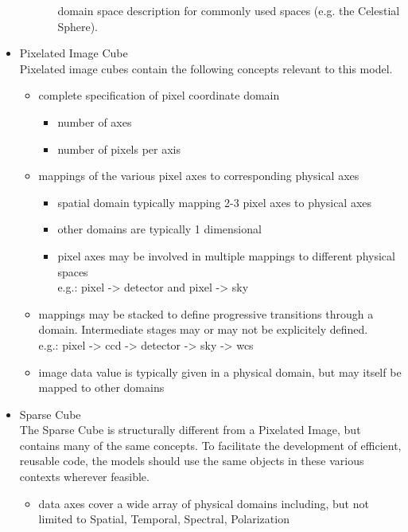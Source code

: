 \documentclass[11pt,a4paper]{ivoa}
\begin{document}
\begin{itemize}
\begin{itemize}
\begin{itemize}
                domain space description for commonly used spaces (e.g. the Celestial Sphere). 
       \end{itemize}
    \end{itemize}
    \item Pixelated Image Cube \\
      Pixelated image cubes contain the following concepts relevant to this model.
    \begin{itemize}
       \item complete specification of pixel coordinate domain
       \begin{itemize}
          \item number of axes
          \item number of pixels per axis
       \end{itemize}
       \item mappings of the various pixel axes to corresponding physical axes
       \begin{itemize}
          \item spatial domain typically mapping 2-3 pixel axes to physical axes
          \item other domains are typically 1 dimensional
          \item pixel axes may be involved in multiple mappings to different physical spaces \\
            e.g.:  pixel -> detector and pixel -> sky
       \end{itemize}
       \item mappings may be stacked to define progressive transitions through a domain.  Intermediate stages may or may not be explicitely defined. \\
          e.g.:  pixel -> ccd -> detector -> sky -> wcs
       \item image data value is typically given in a physical domain, but may itself be mapped to other domains
    \end{itemize}
    \item Sparse Cube \\
      The Sparse Cube is structurally different from a Pixelated Image, but contains many of the same concepts.  To facilitate the development
      of efficient, reusable code, the models should use the same objects in these various contexts wherever feasible.
    \begin{itemize}
       \item data axes cover a wide array of physical domains including, but not limited to Spatial, Temporal, Spectral, Polarization

\end{itemize}
\end{itemize}
\end{document}
